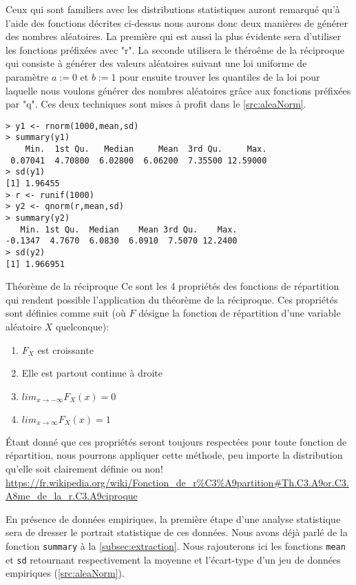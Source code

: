 Ceux qui sont familiers avec les distributions statistiques auront remarqué qu'à l'aide des fonctions décrites ci-dessus nous aurons donc deux manières de générer des nombres aléatoires. La première qui est aussi la plus évidente sera d'utiliser les fonctions préfixées avec "r". La seconde utilisera le théroême de la réciproque qui consiste à générer des valeurs aléatoires suivant une loi uniforme de paramètre $a := 0$ et $b := 1$ pour ensuite trouver les quantiles de la loi pour laquelle nous voulons générer des nombres aléatoires grâce aux fonctions préfixées par "q". Ces deux techniques sont mises à profit dans le \autoref{src:aleaNorm}. \\

\begin{lstlisting}[caption = Génération de nombres aléatoires,label=src:aleaNorm]
> y1 <- rnorm(1000,mean,sd)
> summary(y1)
    Min.  1st Qu.   Median     Mean  3rd Qu.     Max. 
 0.07041  4.70800  6.02800  6.06200  7.35500 12.59000 
> sd(y1)
[1] 1.96455
> r <- runif(1000)
> y2 <- qnorm(r,mean,sd)
> summary(y2)
   Min. 1st Qu.  Median    Mean 3rd Qu.    Max. 
-0.1347  4.7670  6.0830  6.0910  7.5070 12.2400 
> sd(y2)
[1] 1.966951
\end{lstlisting}

\begin{moreInfo}{Théorème de la réciproque}
	Ce sont les 4 propriétés des fonctions de répartition qui rendent possible l'application du théorème de la réciproque. Ces propriétés sont définies comme suit (où $F$ désigne la fonction de répartition d'une variable aléatoire $X$ quelconque):
	\begin{enumerate}
		\item $F_X$ est croissante
		\item Elle est partout continue à droite
		\item $lim_{x \rightarrow -\infty} F_X(x) = 0$
		\item $lim_{x \rightarrow \infty} F_X(x) = 1$
	\end{enumerate}
	Étant donné que ces propriétés seront toujours respectées pour toute fonction de répartition, nous pourrons appliquer cette méthode, peu importe la distribution qu'elle soit clairement définie ou non! \\
	\url{https://fr.wikipedia.org/wiki/Fonction_de_r%C3%A9partition#Th.C3.A9or.C3.A8me_de_la_r.C3.A9ciproque}
\end{moreInfo}

En présence de données empiriques, la première étape d'une analyse statistique sera de dresser le portrait statistique de ces données. Nous avons déjà parlé de la fonction \texttt{summary} à la \autoref{subsec:extraction}. Nous rajouterons ici les fonctions \texttt{mean} et \texttt{sd} retournant respectivement la moyenne et l'écart-type d'un jeu de données empiriques (\autoref{src:aleaNorm}). \\

